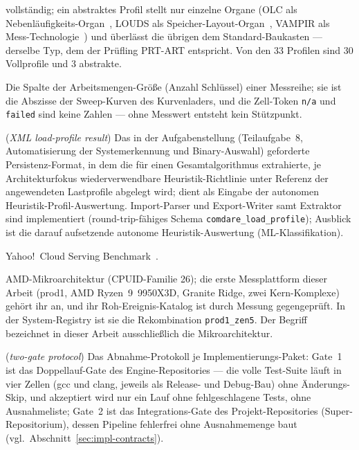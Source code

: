 \begin{description}
  vollständig; ein abstraktes Profil stellt nur einzelne Organe (OLC als
  Nebenläufigkeits-Organ~\cite{leis2016olc}, LOUDS als
  Speicher-Layout-Organ~\cite{jacobson1989louds}, VAMPIR als
  Mess-Technologie~\cite{berthold2023vampir}) und überlässt die übrigen dem Standard-Baukasten ---
  derselbe Typ, dem der Prüfling PRT-ART entspricht. Von den 33 Profilen sind 30 Vollprofile und
  3 abstrakte.
  \item[working\_set\_n] Die Spalte der Arbeitsmengen-Größe (Anzahl Schlüssel) einer Messreihe;
  sie ist die Abszisse der Sweep-Kurven des Kurvenladers, und die Zell-Token \texttt{n/a} und
  \texttt{failed} sind keine Zahlen --- ohne Messwert entsteht kein Stützpunkt.
  \item[XML-Lastprofil-Ergebnis] (\emph{XML load-profile result}) Das in der Aufgabenstellung
  (Teilaufgabe~8, Automatisierung der Systemerkennung und Binary-Auswahl) geforderte
  Persistenz-Format, in dem die für einen Gesamtalgorithmus extrahierte, je Architekturfokus
  wiederverwendbare Heuristik-Richtlinie unter Referenz der angewendeten Lastprofile abgelegt wird;
  dient als Eingabe der autonomen Heuristik-Profil-Auswertung. Import-Parser und Export-Writer
  samt Extraktor sind implementiert (round-trip-fähiges Schema \texttt{comdare\_load\_profile});
  Ausblick ist die darauf aufsetzende autonome Heuristik-Auswertung (ML-Klassifikation).
  \item[YCSB] Yahoo!\ Cloud Serving Benchmark~\cite{cooper2010ycsb}.
  \item[Zen~5] AMD-Mikroarchitektur (CPUID-Familie 26); die erste Messplattform dieser Arbeit
  (prod1, AMD Ryzen~9~9950X3D, Granite Ridge, zwei Kern-Komplexe) gehört ihr an, und ihr %
  Roh-Ereignis-Katalog ist durch Messung gegengeprüft. In der System-Registry ist sie die
  Rekombination \texttt{prod1\_zen5}. Der Begriff bezeichnet in dieser Arbeit ausschließlich die
  Mikroarchitektur.
  \item[Zwei-Gate-Protokoll] (\emph{two-gate protocol}) Das Abnahme-Protokoll je
  Implementierungs-Paket: Gate~1 ist das Doppellauf-Gate des Engine-Repositories --- die volle
  Test-Suite läuft in vier Zellen (gcc und clang, jeweils als Release- und Debug-Bau) ohne
  Änderungs-Skip, und akzeptiert wird nur ein Lauf ohne fehlgeschlagene Tests, ohne Ausnahmeliste;
  Gate~2 ist das Integrations-Gate des Projekt-Repositories (Super-Repositorium), dessen Pipeline
  fehlerfrei ohne Ausnahmemenge baut (vgl.\ Abschnitt~\ref{sec:impl-contracts}).
\end{description}
